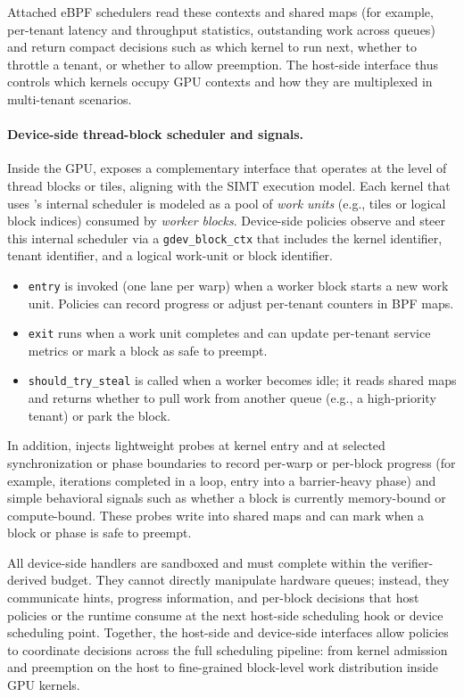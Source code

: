 Attached eBPF schedulers read these contexts and shared maps (for example, per-tenant
latency and throughput statistics, outstanding work across queues) and return compact
decisions such as which kernel to run next, whether to throttle a tenant, or whether
to allow preemption. The host-side interface thus controls which kernels occupy GPU
contexts and how they are multiplexed in multi-tenant scenarios.

\paragraph{Device-side thread-block scheduler and signals.}
Inside the GPU, \sys exposes a complementary interface that operates at the level of
thread blocks or tiles, aligning with the SIMT execution model. Each kernel that uses \sys's internal scheduler is modeled as a pool of \emph{work units} (e.g., tiles or logical block indices) consumed by \emph{worker blocks}. Device-side policies observe and steer this internal scheduler via a \texttt{gdev\_block\_ctx} that includes the kernel identifier, tenant identifier, and a logical work-unit or block identifier.

\begin{itemize}[leftmargin=*]
  \item \texttt{entry} is invoked (one lane per warp) when a worker block starts a new work unit. Policies can record progress or adjust per-tenant counters in BPF maps.
  \item \texttt{exit} runs when a work unit completes and can update per-tenant service metrics or mark a block as safe to preempt.
  \item \texttt{should\_try\_steal} is called when a worker becomes idle; it reads shared maps and returns whether to pull work from another queue (e.g., a high-priority tenant) or park the block.
\end{itemize}

In addition, \sys injects lightweight probes at kernel entry and at selected synchronization or phase boundaries to record per-warp or per-block progress (for example, iterations completed in a loop, entry into a barrier-heavy phase) and simple behavioral signals such as whether a block is currently memory-bound or compute-bound. These probes write into shared maps and can mark when a block or phase is safe to preempt.

All device-side handlers are sandboxed and must complete within the verifier-derived budget. They cannot directly manipulate hardware queues; instead, they communicate hints, progress information, and per-block decisions that host policies or the \sys runtime consume at the next host-side scheduling hook or device scheduling point. Together, the host-side and device-side interfaces allow \sys policies to coordinate decisions across the full scheduling pipeline: from kernel admission and preemption on the host to fine-grained block-level work distribution inside GPU kernels.

